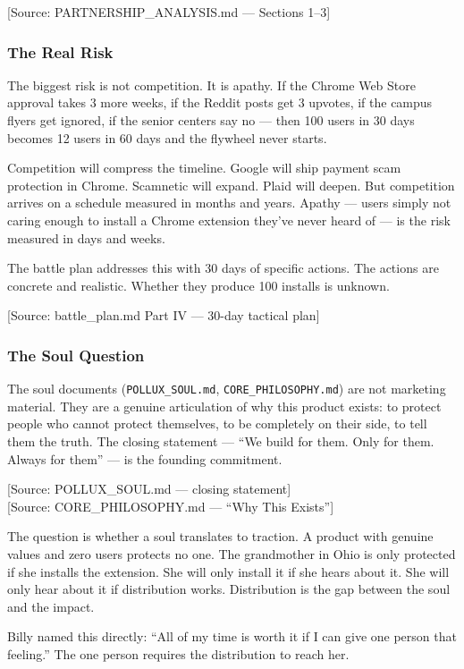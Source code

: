 \documentclass[11pt, letterpaper]{article}
\newcommand{\source}[1]{\textcolor{citation}{[Source: #1]}}
\begin{document}
  \source{PARTNERSHIP\_ANALYSIS.md --- Sections 1--3}

  \subsubsection{The Real Risk}

  The biggest risk is not competition. It is apathy. If the Chrome Web Store approval takes 3 more weeks, if the Reddit posts get 3 upvotes, if the campus flyers get ignored, if the senior centers say no --- then 100 users in 30 days becomes 12 users in 60 days and the flywheel never starts.

  Competition will compress the timeline. Google will ship payment scam protection in Chrome. Scamnetic will expand. Plaid will deepen. But competition arrives on a schedule measured in months and years. Apathy --- users simply not caring enough to install a Chrome extension they've never heard of --- is the risk measured in days and weeks.

  The battle plan addresses this with 30 days of specific actions. The actions are concrete and realistic. Whether they produce 100 installs is unknown.

  \source{battle\_plan.md Part IV --- 30-day tactical plan}

  \subsubsection{The Soul Question}

  The soul documents (\texttt{POLLUX\_SOUL.md}, \texttt{CORE\_PHILOSOPHY.md}) are not marketing material. They are a genuine articulation of why this product exists: to protect people who cannot protect themselves, to be completely on their side, to tell them the truth. The closing statement --- ``We build for them. Only for them. Always for them'' --- is the founding commitment.

  \source{POLLUX\_SOUL.md --- closing statement}\\
  \source{CORE\_PHILOSOPHY.md --- ``Why This Exists''}

  The question is whether a soul translates to traction. A product with genuine values and zero users protects no one. The grandmother in Ohio is only protected if she installs the extension. She will only install it if she hears about it. She will only hear about it if distribution works. Distribution is the gap between the soul and the impact.

  Billy named this directly: ``All of my time is worth it if I can give one person that feeling.'' The one person requires the distribution to reach her.
\end{document}
